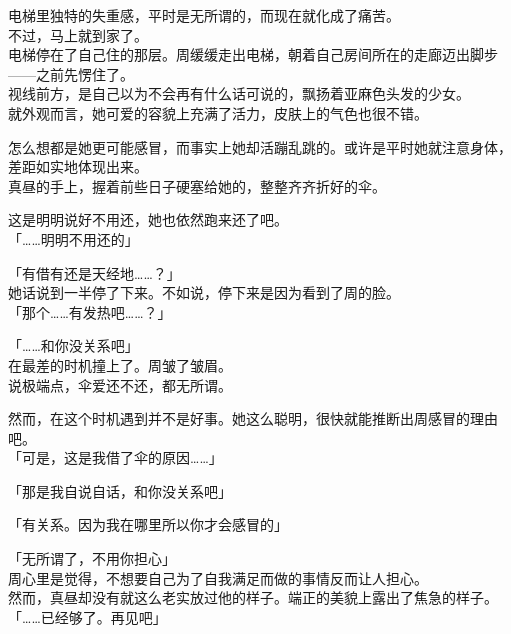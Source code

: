 电梯里独特的失重感，平时是无所谓的，而现在就化成了痛苦。\\

不过，马上就到家了。\\

电梯停在了自己住的那层。周缓缓走出电梯，朝着自己房间所在的走廊迈出脚步——之前先愣住了。\\

视线前方，是自己以为不会再有什么话可说的，飘扬着亚麻色头发的少女。\\

就外观而言，她可爱的容貌上充满了活力，皮肤上的气色也很不错。

怎么想都是她更可能感冒，而事实上她却活蹦乱跳的。或许是平时她就注意身体，差距如实地体现出来。\\

真昼的手上，握着前些日子硬塞给她的，整整齐齐折好的伞。

这是明明说好不用还，她也依然跑来还了吧。\\

「……明明不用还的」

「有借有还是天经地……？」\\

她话说到一半停了下来。不如说，停下来是因为看到了周的脸。\\

「那个……有发热吧……？」

「……和你没关系吧」\\

在最差的时机撞上了。周皱了皱眉。\\

说极端点，伞爱还不还，都无所谓。

然而，在这个时机遇到并不是好事。她这么聪明，很快就能推断出周感冒的理由吧。\\

「可是，这是我借了伞的原因……」

「那是我自说自话，和你没关系吧」

「有关系。因为我在哪里所以你才会感冒的」

「无所谓了，不用你担心」\\

周心里是觉得，不想要自己为了自我满足而做的事情反而让人担心。\\

然而，真昼却没有就这么老实放过他的样子。端正的美貌上露出了焦急的样子。\\

「……已经够了。再见吧」\\

